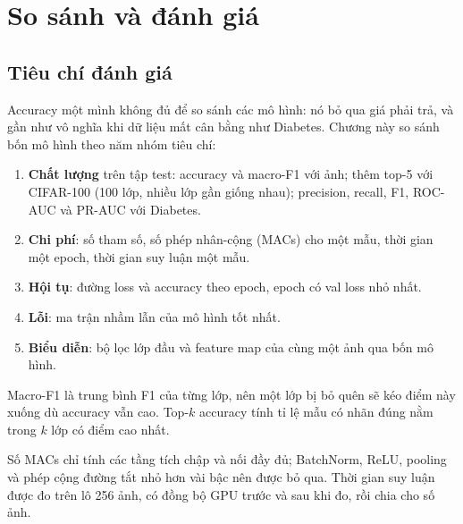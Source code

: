 \chapter{So sánh và đánh giá}
\label{ch:sosanh}

\section{Tiêu chí đánh giá}

Accuracy một mình không đủ để so sánh các mô hình: nó bỏ qua giá phải trả, và gần như vô nghĩa khi dữ liệu mất cân bằng
như Diabetes. Chương này so sánh bốn mô hình theo năm nhóm tiêu chí:

\begin{enumerate}
  \item \textbf{Chất lượng} trên tập test: accuracy và macro-F1 với ảnh; thêm top-5 với CIFAR-100 (100 lớp, nhiều lớp
        gần giống nhau); precision, recall, F1, ROC-AUC và PR-AUC với Diabetes.
  \item \textbf{Chi phí}: số tham số, số phép nhân-cộng (MACs) cho một mẫu, thời gian một epoch, thời gian suy luận
        một mẫu.
  \item \textbf{Hội tụ}: đường loss và accuracy theo epoch, epoch có val loss nhỏ nhất.
  \item \textbf{Lỗi}: ma trận nhầm lẫn của mô hình tốt nhất.
  \item \textbf{Biểu diễn}: bộ lọc lớp đầu và feature map của cùng một ảnh qua bốn mô hình.
\end{enumerate}

Macro-F1 là trung bình F1 của từng lớp, nên một lớp bị bỏ quên sẽ kéo điểm này xuống dù accuracy vẫn cao. Top-$k$
accuracy tính tỉ lệ mẫu có nhãn đúng nằm trong $k$ lớp có điểm cao nhất.


Số MACs chỉ tính các tầng tích chập và nối đầy đủ; BatchNorm, ReLU, pooling và phép cộng đường tắt nhỏ hơn vài bậc nên
được bỏ qua. Thời gian suy luận được đo trên lô 256 ảnh, có đồng bộ GPU trước và sau khi đo, rồi chia cho số ảnh.


